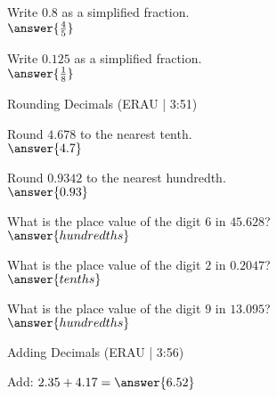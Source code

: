 \documentclass{ximera}
\begin{document}
\begin{problem}
Write $0.8$ as a simplified fraction.\\
$\answer{\frac{4}{5}}$
\end{problem}

\begin{problem}
Write $0.125$ as a simplified fraction.\\
$\answer{\frac{1}{8}}$
\end{problem}


\begin{problem}
Rounding Decimals (ERAU | 3:51)


\begin{problem}
Round $4.678$ to the nearest tenth.\\
$\answer{4.7}$
\end{problem}

\begin{problem}
Round $0.9342$ to the nearest hundredth.\\
$\answer{0.93}$
\end{problem}

\begin{problem}
What is the place value of the digit $6$ in $45.628$?\\
$\answer{hundredths}$
\end{problem}

\begin{problem}
What is the place value of the digit $2$ in $0.2047$?\\
$\answer{tenths}$
\end{problem}

\begin{problem}
What is the place value of the digit $9$ in $13.095$?\\
$\answer{hundredths}$
\end{problem}

\end{problem}

\begin{problem}
Adding Decimals (ERAU | 3:56)


\end{problem}


\begin{problem}
Add: $2.35 + 4.17 = \answer{6.52}$
\end{problem}
\end{document}

